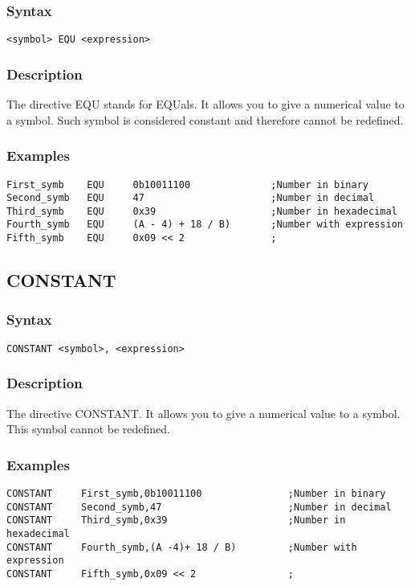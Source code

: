         \subsubsection{Syntax}
            \verb'<symbol> EQU <expression>'

        \subsubsection{Description}
            The directive EQU stands for EQUals. It allows you to give a numerical value to a symbol. Such symbol is considered constant and therefore cannot be redefined.

        \subsubsection{Examples}
            \verb'First_symb    EQU     0b10011100              ;Number in binary'\\
            \verb'Second_symb   EQU     47                      ;Number in decimal'\\
            \verb'Third_symb    EQU     0x39                    ;Number in hexadecimal'\\
            \verb'Fourth_symb   EQU     (A - 4) + 18 / B)       ;Number with expression'\\
            \verb'Fifth_symb    EQU     0x09 << 2               ;'

    \subsection{CONSTANT}
        \subsubsection{Syntax}
            \verb'CONSTANT <symbol>, <expression>'

        \subsubsection{Description}
            The directive CONSTANT. It allows you to give a numerical value to a symbol. This symbol cannot be redefined.

        \subsubsection{Examples}
            \verb'CONSTANT     First_symb,0b10011100               ;Number in binary'\\
            \verb'CONSTANT     Second_symb,47                      ;Number in decimal'\\
            \verb'CONSTANT     Third_symb,0x39                     ;Number in hexadecimal'\\
            \verb'CONSTANT     Fourth_symb,(A -4)+ 18 / B)         ;Number with expression'\\
            \verb'CONSTANT     Fifth_symb,0x09 << 2                ;'


